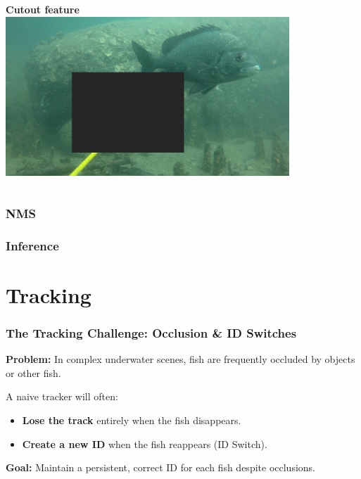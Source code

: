 \documentclass[serif]{beamer}  %
\begin{document}
\begin{frame}
\begin{columns}
\begin{column}{0.5\textwidth}
	\centering
	\textbf{Cutout feature}
	\includegraphics[width=0.8\textwidth]{images/cutout.jpg}
\end{column}
\end{columns}

\end{frame}

\begin{frame}
\frametitle{NMS}
\end{frame}

\begin{frame}
\frametitle{Inference}
\end{frame}

\section{Tracking}

\begin{frame}
    \frametitle{The Tracking Challenge: Occlusion \& ID Switches}
    
    \textbf{Problem:} In complex underwater scenes, fish are frequently occluded by objects or other fish.
    \vspace{1em}
            
    A naive tracker will often:
    \begin{itemize}
        \item \textbf{Lose the track} entirely when the fish disappears.
        \item \textbf{Create a new ID} when the fish reappears (\textcolor{deepred}{ID Switch}).
    \end{itemize}
    
    \vspace{1em}
    \textbf{Goal:} Maintain a persistent, correct ID for each fish despite occlusions.
\end{frame}
\end{document}
